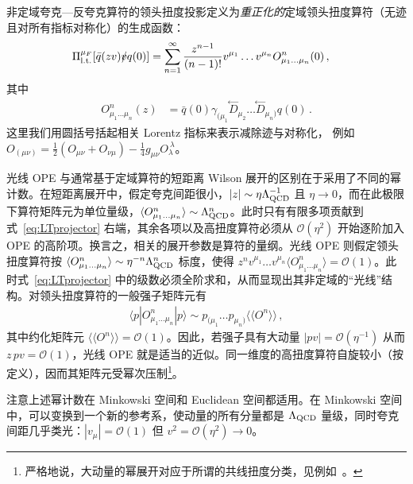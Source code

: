 非定域夸克—反夸克算符的领头扭度投影定义为\emph{重正化的}定域领头扭度算符（无迹且对所有指标对称化）的生成函数：
\begin{align}
\Pi_{\rm l.t.}^{\mu_F}[\bar q (z v) \slashed{v} q(0)]
&= \sum_{n=1}^\infty \frac{z^{n-1}}{(n-1)!} v^{\mu_1}\ldots v^{\mu_n} O_{\mu_1\ldots\mu_n}^{n}(0)\,,
\label{eq:LTprojector}
\end{align}
其中
\begin{align}
  O_{\mu_1\ldots\mu_n}^{n}(z) &=
\bar q(0)\gamma_{(\mu_1}\!\!\stackrel{\leftarrow}{D}_{\mu_2}\ldots \!\stackrel{\leftarrow}{D}_{\mu_{n})} q(0)\,.
\end{align}
%
这里我们用圆括号括起相关 Lorentz 指标来表示减除迹与对称化，
例如 $O_{(\mu\nu)} = \frac12 (O_{\mu\nu}+ O_{\nu\mu}) - \frac14 g_{\mu\nu} O_{\lambda}^{~\lambda}$。

光线 OPE 与通常基于定域算符的短距离 Wilson 展开的区别在于采用了不同的幂计数。在短距离展开中，假定夸克间距很小，$|z| \sim \eta \Lambda^{-1}_{\rm QCD}$ 且 $\eta\to 0$，而在此极限下算符矩阵元为单位量级，$\langle O_{\mu_1\ldots\mu_n}^{n} \rangle \sim \Lambda^{n}_{\rm QCD}$。此时只有有限多项贡献到式~\eqref{eq:LTprojector} 右端，其余各项以及高扭度算符必须从 $\mathcal{O}(\eta^2)$ 开始逐阶加入 OPE 的高阶项。换言之，相关的展开参数是算符的量纲。光线 OPE 则假定领头扭度算符按 $\langle O_{\mu_1\ldots\mu_n}^{n} \rangle \sim \eta^{-n} \Lambda^{n}_{\rm QCD}$ 标度，使得 $ z^n v^{\mu_1}\ldots v^{\mu_n} \langle O_{\mu_1\ldots\mu_n}^{n} \rangle  = \mathcal{O}(1)$。此时式~\eqref{eq:LTprojector} 中的级数必须全阶求和，从而显现出其非定域的``光线''结构。对领头扭度算符的一般强子矩阵元有
\begin{align}
 \langle p | O_{\mu_1\ldots\mu_n}^{n} |p\rangle \sim p_{(\mu_1}\ldots p_{\mu_n)} \langle\!\langle O^{n} \rangle\!\rangle\,,
\end{align}
其中约化矩阵元 $\langle\!\langle O^{n} \rangle\!\rangle = \mathcal{O}(1)$。因此，若强子具有大动量 $|pv| = \mathcal{O}(\eta^{-1})$ 从而 $ z\,pv =  \mathcal{O}(1)$，光线 OPE 就是适当的近似。同一维度的高扭度算符自旋较小（按定义），因而其矩阵元受幂次压制\footnote{严格地说，大动量的幂展开对应于所谓的共线扭度分类，见例如~\cite{Geyer:1999uq,Geyer:2000ig}。}。

注意上述幂计数在 Minkowski 空间和 Euclidean 空间都适用。在 Minkowski 空间中，可以变换到一个新的参考系，使动量的所有分量都是 $\Lambda_{\rm QCD}$ 量级，同时夸克间距几乎类光：$|v_\mu| = \mathcal{O}(1)$ 但
$v^2 = \mathcal{O}(\eta^2) \to 0$。

